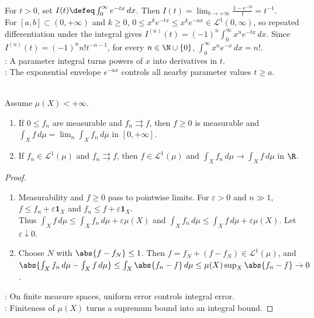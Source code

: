 \begin{example} \label{ex:laplace-transform-powers-factorials} \\
For $t>0$, set $I(t)\defeq\int_0^\infty e^{-tx}\,dx$. Then $I(t)=\lim_{b\to+\infty}\frac{1-e^{-tb}}{t}=t^{-1}$.\\
For $[a,b]\subset(0,+\infty)$ and $k\geq0$, $0\leq x^ke^{-tx}\leq x^ke^{-ax}\in\mathscr{L}^1(0,\infty)$, so repeated differentiation under the integral gives $I^{(n)}(t)=(-1)^n\int_0^\infty x^ne^{-tx}\,dx$. Since $I^{(n)}(t)=(-1)^nn!t^{-n-1}$, for every $n\in\N\cup\{0\}$, $\int_0^\infty x^ne^{-x}\,dx=n!$.\\
: A parameter integral turns powers of $x$ into derivatives in $t$.\\
: The exponential envelope $e^{-ax}$ controls all nearby parameter values $t\geq a$.
\end{example}

\begin{proposition} \label{prop:uniform-convergence-finite-measure-integrals} \\
Assume $\mu(X)<+\infty$.
\begin{enumerate}[label=(\roman*)]
\setlength{\itemsep}{0pt}
\item If $0\leq f_n$ are measurable and $f_n\rightrightarrows f$, then $f\geq0$ is measurable and $\int_X f\,d\mu=\lim_n\int_X f_n\,d\mu$ in $[0,+\infty]$.
\item If $f_n\in\mathscr{L}^1(\mu)$ and $f_n\rightrightarrows f$, then $f\in\mathscr{L}^1(\mu)$ and $\int_Xf_n\,d\mu\to\int_Xf\,d\mu$ in $\R$.
\end{enumerate}
\begin{proof}
\begin{enumerate}[label=(\roman*)]
\setlength{\itemsep}{0pt}
\item Measurability and $f\geq0$ pass to pointwise limits. For $\varepsilon>0$ and $n\gg1$, $f\leq f_n+\varepsilon\mathbf{1}_X$ and $f_n\leq f+\varepsilon\mathbf{1}_X$.\\
Thus $\int_X f\,d\mu\leq \int_X f_n\,d\mu+\varepsilon\mu(X)$ and $\int_X f_n\,d\mu\leq \int_X f\,d\mu+\varepsilon\mu(X)$. Let $\varepsilon\downarrow0$.
\item Choose $N$ with $\abs{f-f_N}\leq1$. Then $f=f_N+(f-f_N)\in\mathscr{L}^1(\mu)$, and\\
$\abs{\int_Xf_n\,d\mu-\int_Xf\,d\mu}\leq\int_X\abs{f_n-f}\,d\mu\leq\mu(X)\sup_X\abs{f_n-f}\to0$.
\end{enumerate}
: On finite measure spaces, uniform error controls integral error.\\
: Finiteness of $\mu(X)$ turns a supremum bound into an integral bound.
\end{proof}
\end{proposition}

